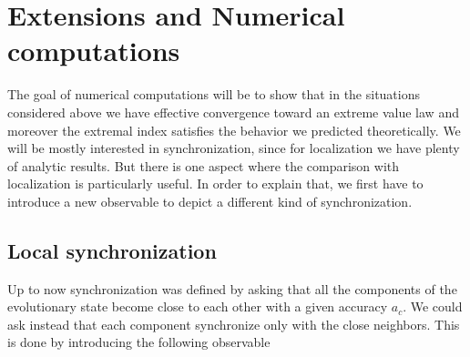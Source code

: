 \documentclass[12pt,reqno,a4paper]{amsart}
\begin{document}
\section{Extensions and Numerical computations}

The goal of numerical computations  will be to show that in the situations considered above we have effective convergence toward an extreme value law and moreover the extremal index satisfies the behavior we predicted theoretically. We will be mostly interested in synchronization, since for localization we have plenty  of analytic results. But there is one aspect where the comparison with localization is particularly useful. In order to explain that, we first have to introduce a new observable to depict a different kind of synchronization.
\subsection{Local synchronization}
 Up to now synchronization  was defined by asking that all the components of the evolutionary state become close to each other with a given accuracy $a_c$. We could ask instead that each component synchronize only with the  close neighbors. This is done by introducing the following observable
\end{document}
